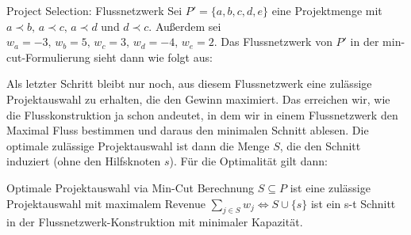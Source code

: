 \documentclass{panikzettel}
\begin{document}
\begin{bsp}{Project Selection: Flussnetzwerk}
	Sei $P' = \{a,b,c,d,e\}$ eine Projektmenge mit $a \prec b,\, a \prec c,\, a \prec d$ und $ d \prec c$. Außerdem sei $w_a = -3, \, w_b = 5, \, w_c = 3, \, w_d = -4, \, w_e = 2$. Das Flussnetzwerk von $P'$ in der min-cut-Formulierung sieht dann wie folgt aus:
	
	\begin{center}
	\end{center}
\end{bsp}

Als letzter Schritt bleibt nur noch, aus diesem Flussnetzwerk eine zulässige Projektauswahl zu erhalten, die den Gewinn maximiert. Das erreichen wir, wie die Flusskonstruktion ja schon andeutet, in dem wir in einem Flussnetzwerk den Maximal Fluss bestimmen und daraus den minimalen Schnitt ablesen. Die optimale zulässige Projektauswahl ist dann die Menge $S$, die den Schnitt induziert (ohne den Hilfsknoten $s$). Für die Optimalität gilt dann:

\begin{theo}{Optimale Projektauswahl via Min-Cut Berechnung}
	$S \subseteq P$  ist eine zulässige Projektauswahl mit maximalem Revenue $\sum_{j \in S} w_j  \Leftrightarrow S \cup \{s \}$ ist ein s-t Schnitt in der Flussnetzwerk-Konstruktion mit minimaler Kapazität.
\end{theo}
\end{document}
